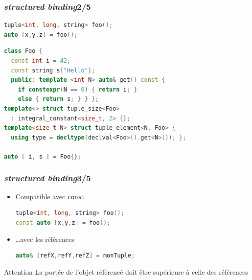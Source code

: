 \documentclass[C++.tex]{subfiles}
\begin{document}
\begin{frame}[fragile]
	\frametitle{\textit{structured binding}\titlehfill{}2/5}
	\begin{lstlisting}[language=C++]
tuple<int, long, string> foo();
auto [x,y,z] = foo();\end{lstlisting}

	\begin{lstlisting}[language=C++]
class Foo {
  const int i = 42;
  const string s{"Hello"}; 
  public: template <int N> auto& get() const {
    if constexpr(N == 0) { return i; }
    else { return s; } } };
template<> struct tuple_size<Foo>
  : integral_constant<size_t, 2> {};
template<size_t N> struct tuple_element<N, Foo> {
  using type = decltype(declval<Foo>().get<N>()); };

auto [ i, s ] = Foo{};\end{lstlisting}

\end{frame}

\begin{frame}[fragile]
	\frametitle{\textit{structured binding}\titlehfill{}3/5}
	\begin{itemize}
		\item Compatible avec \lstinline|const|

		\begin{lstlisting}[language=C++]
tuple<int, long, string> foo();
const auto [x,y,z] = foo();\end{lstlisting}

		\item \ldots{}avec les références

		\begin{lstlisting}[language=C++]
auto& [refX,refY,refZ] = monTuple;\end{lstlisting}
	\end{itemize}

	\begin{alertblock}{Attention}
		La portée de l'objet référencé doit être supérieure à celle des références
	\end{alertblock}

\end{frame}
\end{document}
